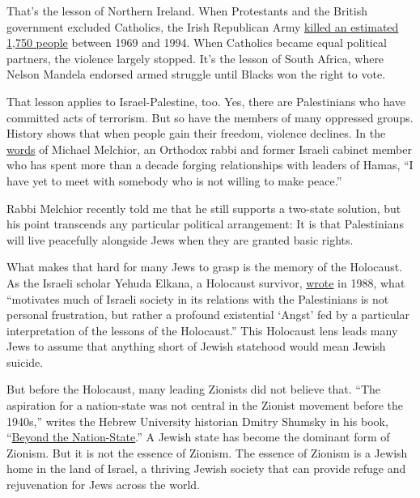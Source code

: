 That's the lesson of Northern Ireland. When Protestants and the British
government excluded Catholics, the Irish Republican Army
\href{https://www.polisci.upenn.edu/ppec/PPEC\%20People/Brendan\%20O'Leary/publications/Journal\%20Articles/Oleary_field_day_review_ira_mission.pdf}{killed
an estimated 1,750 people} between 1969 and 1994. When Catholics became
equal political partners, the violence largely stopped. It's the lesson
of South Africa, where Nelson Mandela endorsed armed struggle until
Blacks won the right to vote.

That lesson applies to Israel-Palestine, too. Yes, there are
Palestinians who have committed acts of terrorism. But so have the
members of many oppressed groups. History shows that when people gain
their freedom, violence declines. In the
\href{https://www.timesofisrael.com/islam-is-more-than-ready-for-peace-with-israel-says-rabbi-who-has-met-with-the-whole-strata-of-radicals/}{words}
of Michael Melchior, an Orthodox rabbi and former Israeli cabinet member
who has spent more than a decade forging relationships with leaders of
Hamas, ``I have yet to meet with somebody who is not willing to make
peace.''

Rabbi Melchior recently told me that he still supports a two-state
solution, but his point transcends any particular political arrangement:
It is that Palestinians will live peacefully alongside Jews when they
are granted basic rights.

What makes that hard for many Jews to grasp is the memory of the
Holocaust. As the Israeli scholar Yehuda Elkana, a Holocaust survivor,
\href{http://web.ceu.hu/yehuda_the_need_to_forget.pdf}{wrote} in 1988,
what ``motivates much of Israeli society in its relations with the
Palestinians is not personal frustration, but rather a profound
existential `Angst' fed by a particular interpretation of the lessons of
the Holocaust.'' This Holocaust lens leads many Jews to assume that
anything short of Jewish statehood would mean Jewish suicide.

But before the Holocaust, many leading Zionists did not believe that.
``The aspiration for a nation-state was not central in the Zionist
movement before the 1940s,'' writes the Hebrew University historian
Dmitry Shumsky in his book,
``\href{https://yalebooks.yale.edu/book/9780300230130/beyond-nation-state}{Beyond
the Nation-State}.'' A Jewish state has become the dominant form of
Zionism. But it is not the essence of Zionism. The essence of Zionism is
a Jewish home in the land of Israel, a thriving Jewish society that can
provide refuge and rejuvenation for Jews across the world.

